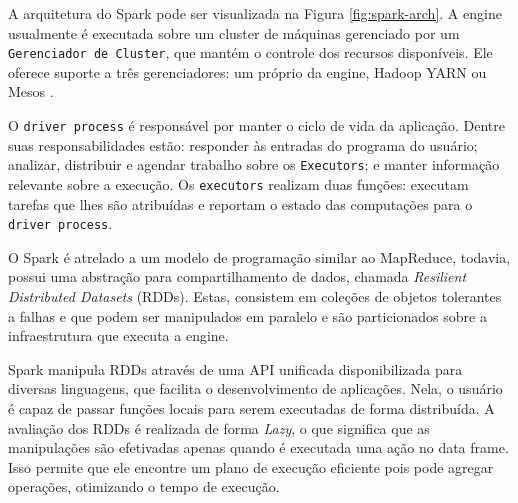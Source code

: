 A arquitetura do Spark pode ser visualizada na Figura \ref{fig:spark-arch}. A 
engine usualmente é executada sobre um cluster de máquinas gerenciado por um 
\texttt{Gerenciador de Cluster}, que mantém o controle dos recursos 
disponíveis. Ele oferece suporte a três gerenciadores: um próprio da engine, 
Hadoop YARN ou Mesos \cite{ref:mesos}.


O \texttt{driver process} é responsável por manter o ciclo de vida da 
aplicação. Dentre suas responsabilidades estão: responder às entradas do 
programa do usuário; analizar, distribuir e agendar trabalho sobre os 
\texttt{Executors}; e manter informação relevante sobre a execução. Os 
\texttt{executors} realizam duas funções: executam tarefas que lhes são 
atribuídas e reportam o estado das computações para o \texttt{driver process}.

O Spark é atrelado a um modelo de programação similar ao MapReduce, todavia, 
possui uma abstração para compartilhamento de dados, chamada \emph{Resilient 
Distributed Datasets} (RDDs). Estas, consistem em coleções de objetos tolerantes 
a falhas e que podem ser manipulados em paralelo e são particionados sobre a 
infraestrutura que executa a engine. 

Spark manipula RDDs através de uma API unificada disponibilizada para diversas 
linguagens, que facilita o desenvolvimento de aplicações. Nela, o usuário é 
capaz de passar funções locais para serem executadas de forma distribuída. A 
avaliação dos RDDs é realizada de forma \emph{Lazy}, o que significa que as 
manipulações são efetivadas apenas quando é executada uma ação no data frame. 
Isso permite que ele encontre um plano de execução eficiente pois pode agregar 
operações, otimizando o tempo de execução.





